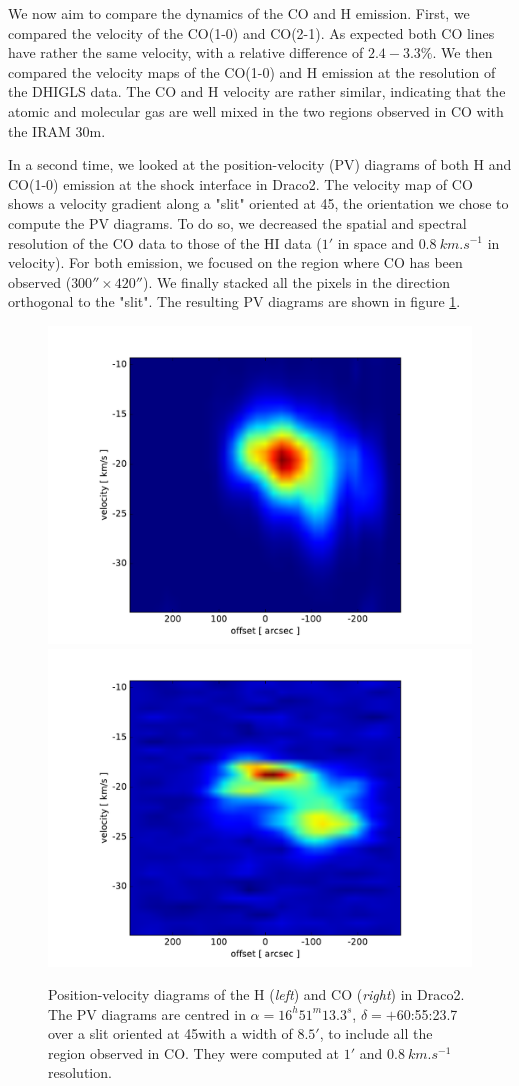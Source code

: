 \documentclass[traditabstract]{aa}
\begin{document}
   We now aim to compare the dynamics of the CO and H emission. First, we compared the velocity of the CO(1-0) and CO(2-1). As expected both CO lines have rather the same velocity, with a relative difference of $2.4-3.3\%$. We then compared the velocity maps of the CO(1-0) and H emission at the resolution of the DHIGLS data. The CO and H velocity are rather similar, indicating that the atomic and molecular gas are well mixed in the two regions observed in CO with the IRAM 30m.

   In a second time, we looked at the position-velocity (PV) diagrams of both H and CO(1-0) emission at the shock interface in Draco2. The velocity map of CO shows a velocity gradient along a "slit" oriented at 45\degree, the orientation we chose to compute the PV diagrams. To do so, we decreased the spatial and spectral resolution of the CO data to those of the HI data ($1'$ in space and $0.8\: km.s^{-1}$ in velocity). For both emission, we focused on the region where CO has been observed ($300''\times 420''$). We finally stacked all the pixels in the direction orthogonal to the "slit". The resulting PV diagrams are shown in figure \ref{PV-diag}.

\begin{figure}[h!]
  \centering
  \includegraphics[width=0.48\linewidth,trim=70 10 95 40,clip=true]{Figures/PV_diagram_HI.pdf}
  \hspace{3mm}
  \includegraphics[width=0.48\linewidth,trim=70 10 95 40,clip=true]{Figures/PV_diagram_CO.pdf}
  \caption{\label{PV-diag} Position-velocity diagrams of the H (\emph{left}) and CO (\emph{right}) in Draco2. The PV diagrams are centred in $\alpha=16^h 51^m 13.3^s$, $\delta=+$60:55:23.7 over a slit oriented at 45\degree with a width of $8.5'$, to include all the region observed in CO. They were computed at $1'$ and $0.8\: km.s^{-1}$ resolution.}
\end{figure}
\end{document}

